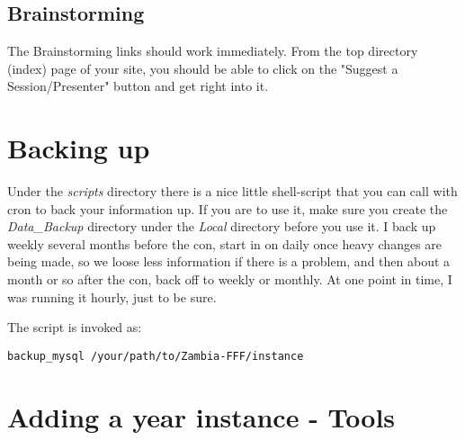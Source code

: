 \documentclass[captions=tablesignature]{scrartcl}
\begin{document}
\subsection{Brainstorming}
\label{sec-8-2}

The Brainstorming links should work immediately.  From the top
directory (index) page of your site, you should be able to click on
the "Suggest a Session/Presenter" button and get right into it.

\section{Backing up}
\label{sec-9}

Under the \emph{scripts} directory there is a nice little shell-script
that you can call with cron to back your information up.  If you are
to use it, make sure you create the \emph{Data\_Backup} directory under
the \emph{Local} directory before you use it.  I back up weekly several
months before the con, start in on daily once heavy changes are
being made, so we loose less information if there is a problem, and
then about a month or so after the con, back off to weekly or
monthly.  At one point in time, I was running it hourly, just to be
sure.

The script is invoked as:
\begin{verbatim}
backup_mysql /your/path/to/Zambia-FFF/instance
\end{verbatim}

\section{Adding a year instance - Tools}
\label{sec-10}
\end{document}
